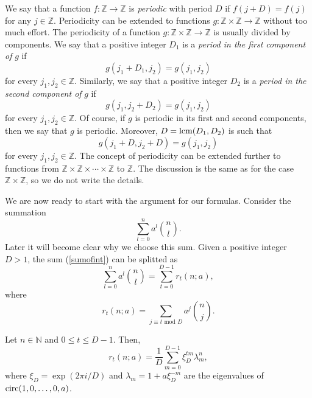 We say that a function $f:\mathbb{Z}\rightarrow\mathbb{Z}$ is {\em periodic} with period $D$ if $f(j+D)=f(j)$
for any $j\in\mathbb{Z}$.  Periodicity can be extended to functions $g:\mathbb{Z}\times \mathbb{Z}\to\mathbb{Z}$ without too much effort.  The periodicity of a function  $g:\mathbb{Z}\times \mathbb{Z}\rightarrow\mathbb{Z}$ is usually divided by components.  We say that a positive integer $D_1$ is a {\it period in the first component of} $g$ if 
\begin{equation}
g(j_1+D_1,j_2)=g(j_1,j_2) 
\end{equation}
for every $j_1,j_2 \in \mathbb{Z}$.  Similarly, we say that a positive integer $D_2$ is a {\it period in the second component of} $g$ if 
\begin{equation}
g(j_1,j_2+D_2)=g(j_1,j_2)
\end{equation} 
for every $j_1,j_2 \in \mathbb{Z}$. Of course, if $g$ is periodic in its first and second components, then we say that $g$ is periodic.  Moreover, $D=\operatorname{lcm}(D_1,D_2)$ is such that
\begin{equation}
g(j_1+D,j_2+D)=g(j_1,j_2)
\end{equation}
for every $j_1,j_2 \in \mathbb{Z}$.  The concept of periodicity can be extended further to functions from $\mathbb{Z}\times\mathbb{Z}\times\cdots\times \mathbb{Z}$ to $\mathbb{Z}$.  The discussion is the same as for the case $\mathbb{Z}\times \mathbb{Z}$, so we do not write the details.

We are now ready to start with the argument for our formulas. %
Consider the summation
\begin{equation}
\label{sumofint}
\sum_{l=0}^n a^l\binom{n}{l}.
\end{equation}
Later it will become clear why we choose this sum.  Given a positive integer $D>1$, the sum (\ref{sumofint}) can be splitted as 
\begin{equation}
\sum_{l=0}^n a^l\binom{n}{l} = \sum_{t=0}^{D-1} r_t(n;a),
\end{equation}
where 
\begin{equation}
r_t(n;a)=\sum_{j\equiv t \,\,\text{mod }D} a^j\binom{n}{j}.
\end{equation}

\begin{proposition}
\label{closedformprop}
Let $n\in \mathbb{N}$ and $0\leq t \leq D-1$.  Then,
\begin{equation}
r_t(n;a) = \frac{1}{D}\sum_{m=0}^{D-1} \xi_{D}^{t m} \lambda_{m}^n,
\end{equation}
where $\xi_D=\exp(2\pi i/D)$ and $\lambda_m = 1+a\xi_D^{-m}$ are the eigenvalues of $\operatorname{circ}(1,0,\ldots, 0,a)$.
\end{proposition}

